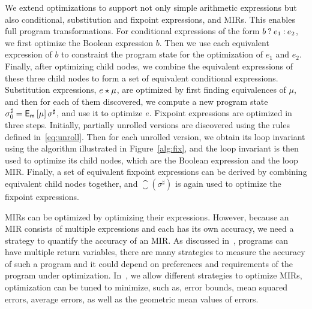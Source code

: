 We extend optimizations to support not only simple arithmetic expressions
but also conditional, substitution and fixpoint expressions, and MIRs.  This
enables full program transformations.  For conditional expressions of the form
$b\mathbin{?} e_1\mathbin{:} e_2$, we first optimize the Boolean expression $b$.  Then
we use each equivalent expression of $b$ to constraint the program state for
the optimization of $e_1$ and $e_2$.  Finally, after optimizing child nodes,
we combine the equivalent expressions of these three child nodes to form a
set of equivalent conditional expressions.  Substitution expressions, $e
\mathbin{\star} \mu$, are optimized by first finding equivalences of $\mu$, and then
for each of them discovered, we compute a new program state $\sigma^\sharp_0
= \operatorname{\mathsf{E}_\mathsf{m}}\left[{\mu}\right] \sigma^\sharp$, and use it to optimize $e$.  Fixpoint
expressions are optimized in three steps.  Initially, partially unrolled
versions are discovered using the rules defined in~\eqref{eq:unroll}.  Then
for each unrolled version, we obtain its loop invariant using the algorithm
illustrated in Figure~\ref{alg:fix}, and the loop invariant is then used to
optimize its child nodes, which are the Boolean expression and the loop MIR\@.
Finally, a set of equivalent fixpoint expressions can be derived by combining
equivalent child nodes together, and $\closure(\sigma^\sharp)$ is again used to
optimize the fixpoint expressions.

MIRs can be optimized by optimizing their expressions.  However, because
an MIR consists of multiple expressions and each has its own accuracy,
we need a strategy to quantify the accuracy of an MIR\@.  As discussed
in~\cite{martel09}, programs can have multiple return variables, there are many
strategies to measure the accuracy of such a program and it could depend on
preferences and requirements of the program under optimization.  In~\newsoap,
we allow different strategies to optimize MIRs, optimization can be tuned to
minimize, such as, error bounds, mean squared errors, average errors, as well
as the geometric mean values of errors.
